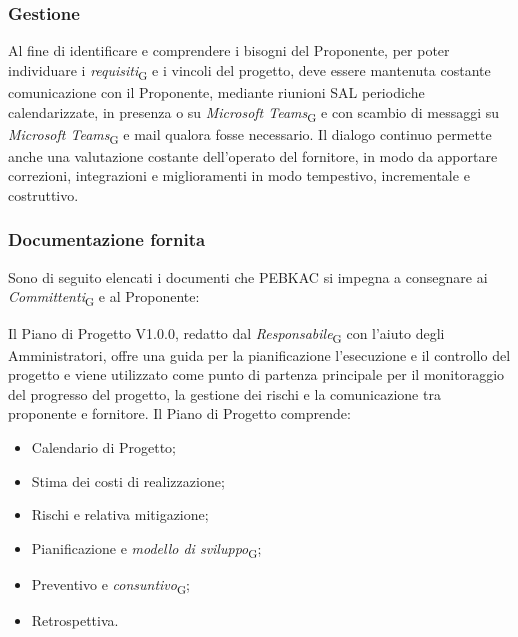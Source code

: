 \subsubsection{Gestione}
Al fine di identificare e comprendere i bisogni del Proponente, per poter individuare i \textit{requisiti}\textsubscript{G} e i vincoli del progetto, deve essere mantenuta costante comunicazione con il Proponente, mediante riunioni SAL periodiche calendarizzate, in presenza o su \textit{Microsoft Teams}\textsubscript{G} e con scambio di messaggi su \textit{Microsoft Teams}\textsubscript{G} e mail qualora fosse necessario. Il dialogo continuo permette anche una valutazione costante dell'operato del fornitore, in modo da apportare correzioni, integrazioni e miglioramenti in modo tempestivo, incrementale e costruttivo.

\subsubsection{Documentazione fornita}
Sono di seguito elencati i documenti che PEBKAC si impegna a consegnare ai \textit{Committenti}\textsubscript{G} e al Proponente: 

Il Piano di Progetto V1.0.0, redatto dal \textit{Responsabile}\textsubscript{G} con l'aiuto degli Amministratori, offre una guida per la pianificazione l'esecuzione e il controllo del progetto e viene utilizzato come punto di partenza principale per il monitoraggio del progresso del progetto, la gestione dei rischi e la comunicazione tra proponente e fornitore.
Il Piano di Progetto comprende:
    \begin{itemize}
        \item Calendario di Progetto;
        \item Stima dei costi di realizzazione;
        \item Rischi e relativa mitigazione;
        \item Pianificazione e \textit{modello di sviluppo}\textsubscript{G};
        \item Preventivo e \textit{consuntivo}\textsubscript{G};
        \item Retrospettiva.
    \end{itemize}

